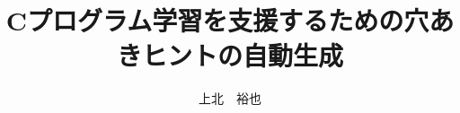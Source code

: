 \documentclass[a4j,12pt,twoside]{jreport}
\author{上北　裕也}
\title{Cプログラム学習を支援するための穴あきヒントの自動生成}
\begin{document}
\maketitle







\begin{contents}
\tableofcontents %
\end{contents}













\end{document}
